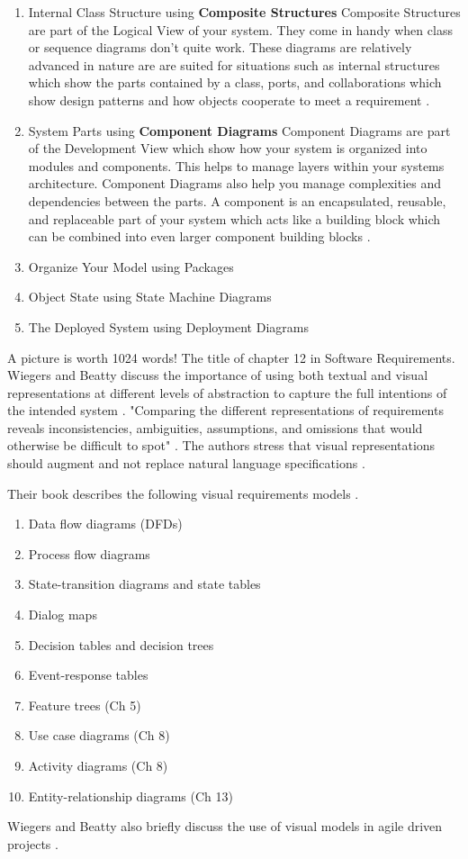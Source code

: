 \documentclass{acm_proc_article-sp}
\begin{document}
\begin{enumerate}
	\item Internal Class Structure using \textbf{Composite Structures}
	\newline
	Composite Structures are part of the Logical View of your system. They come in handy when class or sequence diagrams don't quite work. These diagrams are relatively advanced in nature are are suited for situations such as internal structures which show the parts contained by a class, ports, and collaborations which show design patterns and how objects cooperate to meet a requirement \cite{Lamport:UML}.
	\item System Parts using \textbf{Component Diagrams}
	\newline
	Component Diagrams are part of the Development View which show how your system is organized into modules and components. This helps to manage layers within your systems architecture. Component Diagrams also help you manage complexities and dependencies between the parts. A component is an encapsulated, reusable, and replaceable part of your system which acts like a building block which can be combined into even larger component building blocks \cite{Lamport:UML}.
	\item Organize Your Model using Packages
	\item Object State using State Machine Diagrams
	\item The Deployed System using Deployment Diagrams
\end{enumerate}
A picture is worth 1024 words! The title of chapter 12 in Software Requirements. Wiegers and Beatty discuss the importance of using both textual and visual representations at different levels of abstraction to capture the full intentions of the intended system \cite{Lamport:SoftwareRequirements}. "Comparing the different representations of requirements reveals inconsistencies, ambiguities, assumptions, and omissions that would otherwise be difficult to spot" \cite{Lamport:SoftwareRequirements}. The authors stress that visual representations should augment and not replace natural language specifications \cite{Lamport:SoftwareRequirements}.

Their book describes the following visual requirements models \cite{Lamport:SoftwareRequirements}.
\begin{enumerate}
	\item Data flow diagrams (DFDs)
	
	\item Process flow diagrams 
	\item State-transition diagrams and state tables
	\item Dialog maps
	\item Decision tables and decision trees
	\item Event-response tables
	\item Feature trees (Ch 5)
	\item Use case diagrams (Ch 8)
	\item Activity diagrams (Ch 8)
	\item Entity-relationship diagrams (Ch 13)
\end{enumerate}
Wiegers and Beatty also briefly discuss the use of visual models in agile driven projects \cite{Lamport:SoftwareRequirements}.
\end{document}

